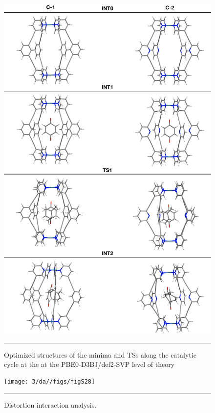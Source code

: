\documentclass[../../main.tex]{subfiles}
\begin{document}
\begin{figure}[h!]
	\vspace{0.4cm}
	\centering
	\includegraphics[width=13cm]{3/da//figs/figS27}
	\vspace{0.2cm}
	\hrule
	\caption{Optimized structures of the minima and TSs along the catalytic cycle at the at the PBE0-D3BJ/def2-SVP level of theory}
	\label{fig::si_da_27}
\end{figure}


\begin{figure}[h!]
	\vspace{0.4cm}
	\centering
	\texttt{[image: 3/da//figs/figS28]}
	\vspace{0.2cm}
	\hrule
	\caption{Distortion interaction analysis.}
	\label{fig::si_da_28}
\end{figure}
\end{document}
